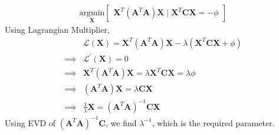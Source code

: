 \documentclass[a4paper]{article}
\begin{document}
\begin{align*}
    \underset{\mathbf{X}}{\mathrm{argmin}} \begin{bmatrix}
        \mathbf{X}^T(\mathbf{A}^T\mathbf{A})\mathbf{X} \mid \mathbf{X}^T\mathbf{C}\mathbf{X} = -\phi
    \end{bmatrix}
\end{align*}
Using Lagrangian Multiplier,
\begin{align*}
             & \mathcal{L}(\mathbf{X})                                  = \mathbf{X}^T(\mathbf{A}^T\mathbf{A})\mathbf{X} - \lambda(\mathbf{X}^T\mathbf{C}\mathbf{X} + \phi) \\
    \implies & \mathcal{L}^\prime(\mathbf{X})                  = 0                                                                                                          \\
    \implies & \mathbf{X}^T(\mathbf{A}^T\mathbf{A})\mathbf{X}  = \lambda\mathbf{X}^T\mathbf{C}\mathbf{X} = \lambda\phi                                                      \\
    \implies & (\mathbf{A}^T\mathbf{A})\mathbf{X} = \lambda\mathbf{C}\mathbf{X}                                                                                             \\
    \implies & \frac{1}{\lambda}\mathbf{X} = (\mathbf{A}^T\mathbf{A})^{-1}\mathbf{C}\mathbf{X}
\end{align*}
Using EVD of $(\mathbf{A}^T\mathbf{A})^{-1}\mathbf{C}$, we find $\lambda^{-1}$, which is the required parameter.
\end{document}

